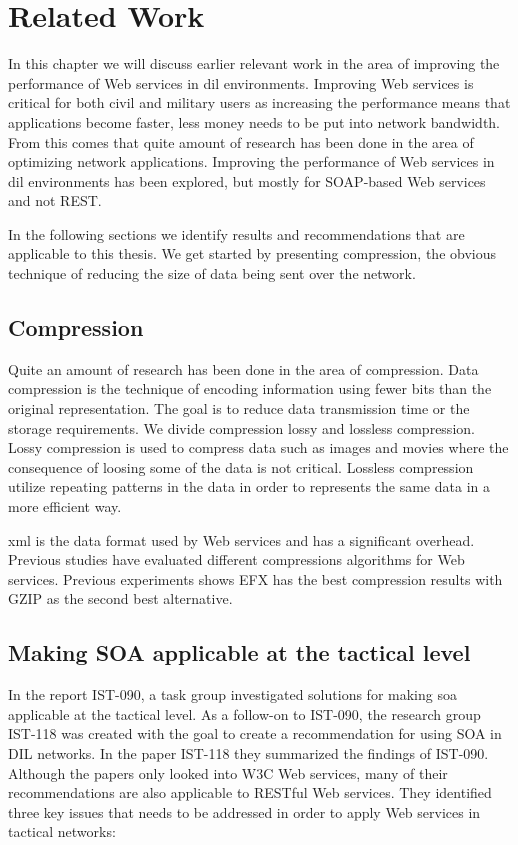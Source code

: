 \chapter{Related Work}

In this chapter we will discuss earlier relevant work in the area of improving
the performance of Web services in \gls{dil} environments. Improving Web
services is critical for both civil and military users as increasing the
performance means that applications become faster, less money needs to be put
into network bandwidth. From this comes that quite amount of research has been
done in the area of optimizing network applications. Improving the performance
of Web services in \gls{dil} environments has been explored, but mostly for
SOAP-based Web services and not REST.

In the following sections we identify results and recommendations that are
applicable to this thesis. We get started by presenting compression, the obvious
technique of reducing the size of data being sent over the network.


\section{Compression}
Quite an amount of research has been done in the area of compression. Data compression is the technique of encoding information using fewer bits than
the original representation. The goal is to reduce data transmission time or the
storage requirements. We divide compression lossy and lossless compression.
Lossy compression is used to compress data such as images and movies where the
consequence of loosing some of the data is not critical. Lossless compression
utilize repeating patterns in the  data in order to represents the same data in
a more efficient way.

\gls{xml} is the data format used by Web services and has a significant
overhead. Previous studies have evaluated different compressions algorithms for
Web services. Previous experiments shows EFX has the best compression results with
GZIP as the second best alternative\cite{johnsen-trude-compression-techniqes}.


\section{Making SOA applicable at the tactical level}

In the report IST-090, a task group investigated solutions for making \gls{soa}
applicable at the tactical level. As a follow-on to IST-090, the research group
IST-118 was created with the goal to create a recommendation for using SOA in
DIL networks. In the paper IST-118 they summarized the findings of IST-090.
Although the papers only looked into W3C Web services, many of their
recommendations are also applicable to RESTful Web services. They identified
three key issues that needs to be addressed in order to apply Web services in
tactical networks\cite{ist-090, ist-118}:

